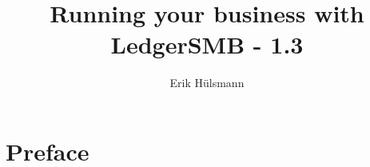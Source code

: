 \documentclass[10pt,A4]{book}
\begin{document}
\author{Erik H\"ulsmann}
\title{Running your business with LedgerSMB - 1.3}


\maketitle


\tableofcontents



\chapter*{Preface}








\end{document}
